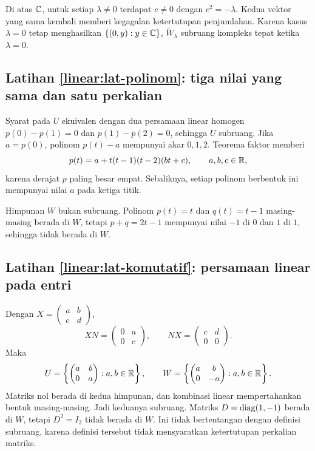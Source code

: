     Di atas $\mathbb{C}$, untuk setiap $\lambda\ne0$ terdapat $c\ne0$
    dengan $c^2=-\lambda$. Kedua vektor yang sama kembali memberi
    kegagalan ketertutupan penjumlahan.
    Karena kasus $\lambda=0$ tetap menghasilkan $\{(0,y):y\in\mathbb{C}\}$,
    $\widetilde W_\lambda$ subruang kompleks tepat ketika $\lambda=0$.

    \subsection*{Latihan \ref{linear:lat-polinom}: tiga nilai yang sama dan satu perkalian}
    Syarat pada $U$ ekuivalen dengan dua persamaan linear homogen
    $p(0)-p(1)=0$ dan $p(1)-p(2)=0$, sehingga $U$ subruang.
    Jika $a=p(0)$, polinom $p(t)-a$ mempunyai akar $0,1,2$.
    Teorema faktor memberi
    \[
        p(t)=a+t(t-1)(t-2)(bt+c),\qquad a,b,c\in\mathbb{R},
    \]
    karena derajat $p$ paling besar empat. Sebaliknya, setiap polinom
    berbentuk ini mempunyai nilai $a$ pada ketiga titik.

    Himpunan $W$ bukan subruang. Polinom $p(t)=t$ dan $q(t)=t-1$
    masing-masing berada di $W$, tetapi $p+q=2t-1$ mempunyai nilai
    $-1$ di $0$ dan $1$ di $1$, sehingga tidak berada di $W$.

    \subsection*{Latihan \ref{linear:lat-komutatif}: persamaan linear pada entri}
    Dengan $X=\begin{pmatrix}a&b\\c&d\end{pmatrix}$,
    \[
        XN=\begin{pmatrix}0&a\\0&c\end{pmatrix},\qquad
        NX=\begin{pmatrix}c&d\\0&0\end{pmatrix}.
    \]
    Maka
    \[
        U=\left\{\begin{pmatrix}a&b\\0&a\end{pmatrix}:a,b\in\mathbb{R}\right\},
        \qquad
        W=\left\{\begin{pmatrix}a&b\\0&-a\end{pmatrix}:a,b\in\mathbb{R}\right\}.
    \]
    Matriks nol berada di kedua himpunan, dan kombinasi linear
    mempertahankan bentuk masing-masing. Jadi keduanya subruang.
    Matriks $D=\operatorname{diag}(1,-1)$ berada di $W$, tetapi $D^2=I_2$ tidak
    berada di $W$. Ini tidak bertentangan dengan definisi subruang,
    karena definisi tersebut tidak mensyaratkan ketertutupan perkalian matriks.

